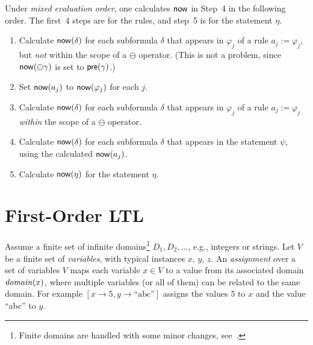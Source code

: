 Under {\em mixed evaluation order}, one calculates $\mathsf{now}$ in Step~4 in the following order. The first~4 steps are for the rules, and step~5 is for the statement $\eta$.
\begin{enumerate}
\item Calculate 
$\mathsf{now} ( \delta )$ for each subformula $\delta$
that appears in $\varphi_j$ of a rule
$a_j := \varphi_j$, but {\em not} within the scope of
a $\ominus$ operator. (This is not
a problem, since
$\mathsf{now} ( \ominus \gamma )$ is set to $\mathsf{pre} ( \gamma )$.)
\item Set 
$\mathsf{now} ( a_j )$ to $\mathsf{now} ( \varphi_j )$ for each $j$.
\item Calculate $\mathsf{now} ( \delta )$ for each subformula $\delta$
that appears in $\varphi_j$ of a rule
$a_j := \varphi_j$ {\em  within} the scope of
a $\ominus$ operator.
\item Calculate $\mathsf{now} ( \delta )$ for each subformula $\delta$
that appears in the statement $\psi$, using the calculated $\mathsf{now} ( a_j )$.
\item Calculate $\mathsf{now} ( \eta )$ for the statement
$\eta$.
\end{enumerate}



\section{First-Order LTL}

\label{sec:syntax-semantics}

Assume a finite set of infinite domains\footnote{Finite domains are handled with some minor changes, see~\cite{HPU}.}
$D_1, D_2, \ldots$,
e.g., integers or strings. 
Let $V$ be a finite set of {\em variables}, 
with typical instances $x$, $y$, $z$.
An {\em assignment} over a set of variables $V$
maps each variable $x \in V$ to a value from
its associated domain $\mathit{domain} ( x )$, where multiple variables (or all of them)
can be related to the same domain. For example
$[ x \rightarrow 5 , y \rightarrow \text{``abc''} ]$ assigns
the values $5$ to $x$ and the value ``abc'' to $y$.


